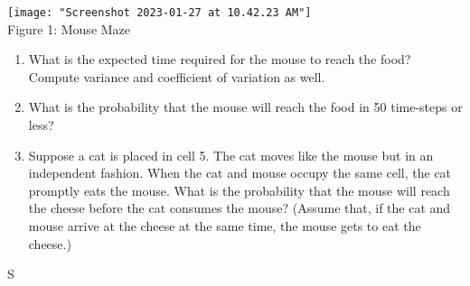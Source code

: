\documentclass[answers]{exam}
\begin{document}
\begin{questions}
	\begin{center}
		\texttt{[image: "Screenshot 2023-01-27 at 10.42.23 AM"]}
		\\ Figure 1: Mouse Maze
	\end{center}
	
	
	\begin{enumerate}[label=(\alph*)]
		\item What is the expected time required for the mouse to reach the food? 
		Compute variance and coefficient of variation as well.
		
		\item What is the probability that the mouse will reach the food in 50 time-steps or less?
		
		\item Suppose a cat is placed in cell 5. 
		The cat moves like the mouse but in an independent fashion. 
		When the cat and mouse occupy the same cell, the cat promptly eats the mouse. 
		What is the probability that the mouse will reach the cheese before the cat consumes the mouse? 
		(Assume that, if the cat and mouse arrive at the cheese at the same time, the mouse gets to eat the cheese.)
	\end{enumerate}
\begin{solution}
	S
\end{solution}

\end{questions}
\end{document}
